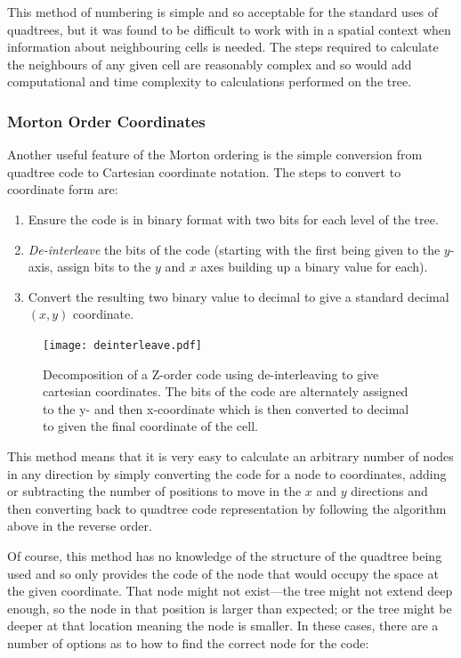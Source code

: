 This method of numbering is simple and so acceptable for the standard uses of
quadtrees, but it was found to be difficult to work with in a spatial context
when information about neighbouring cells is needed. The steps required to
calculate the neighbours of any given cell are reasonably complex and so would
add computational and time complexity to calculations performed on the tree.

\subsubsection*{Morton Order Coordinates}
\label{ssub:morton_order_coordinates}

Another useful feature of the Morton ordering is the simple conversion from
quadtree code to Cartesian coordinate notation. The steps to convert to
coordinate form are:

\begin{enumerate}
	\item Ensure the code is in binary format with two bits for each level of
		the tree.
	\item \emph{De-interleave} the bits of the code (starting with the first
		being given to the $y$-axis, assign bits to the $y$ and $x$ axes
		building up a binary value for each).
	\item Convert the resulting two binary value to decimal to give a standard
		decimal $(x,y)$ coordinate.
\end{enumerate}

\begin{figure}[tbhp]
	\centering
	\texttt{[image: deinterleave.pdf]}

	\caption[Decomposition of a Z-order code to give coordinates.]{Decomposition
		of a Z-order code using de-interleaving to give cartesian coordinates.
		The bits of the code are alternately assigned to the y- and then
		x-coordinate which is then converted to decimal to given the final
		coordinate of the cell.}\label{fig:deinterleave}
\end{figure}

This method means that it is very easy to calculate an arbitrary number of
nodes in any direction by simply converting the code for a node to coordinates,
adding or subtracting the number of positions to move in the $x$ and $y$
directions and then converting back to quadtree code representation by
following the algorithm above in the reverse order.

Of course, this method has no knowledge of the structure of the quadtree being
used and so only provides the code of the node that would occupy the space at
the given coordinate. That node might not exist---the tree might not extend
deep enough, so the node in that position is larger than expected; or the tree
might be deeper at that location meaning the node is smaller. In these cases,
there are a number of options as to how to find the correct node for the code:

